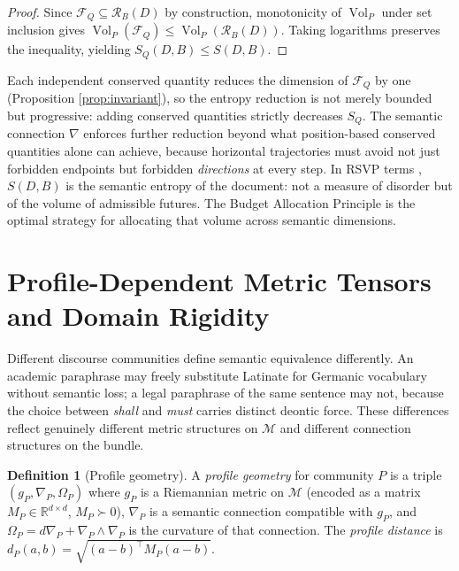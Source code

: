 \documentclass[12pt, a4paper]{article}
\theoremstyle{plain}
\theoremstyle{definition}
\newtheorem{definition}[theorem]{Definition}
\theoremstyle{remark}
\newcommand{\calM}{\mathcal{M}}
\newcommand{\calF}{\mathcal{F}}
\newcommand{\calR}{\mathcal{R}}
\newcommand{\bR}{\mathbb{R}}
\newcommand{\connD}{\nabla}
\newcommand{\curv}{\Omega}
\begin{document}
\begin{proof}
Since $\calF_Q \subseteq \calR_B(D)$ by construction, monotonicity of
$\operatorname{Vol}_P$ under set inclusion gives
$\operatorname{Vol}_P(\calF_Q) \le \operatorname{Vol}_P(\calR_B(D))$.
Taking logarithms preserves the inequality, yielding $S_Q(D,B) \le S(D,B)$.
\end{proof}

Each independent conserved quantity reduces the dimension of $\calF_Q$ by one
(Proposition \ref{prop:invariant}), so the entropy reduction is not merely
bounded but progressive: adding conserved quantities strictly decreases $S_Q$.
The semantic connection $\connD$ enforces further reduction beyond what
position-based conserved quantities alone can achieve, because horizontal
trajectories must avoid not just forbidden endpoints but forbidden
\emph{directions} at every step.  In RSVP terms \cite{flyxion2025rsvp},
$S(D, B)$ is the semantic entropy of the document: not a measure of disorder
but of the volume of admissible futures.  The Budget Allocation Principle is
the optimal strategy for allocating that volume across semantic dimensions.


\section{Profile-Dependent Metric Tensors and Domain Rigidity}
\label{sec:profiles}

Different discourse communities define semantic equivalence differently.  An
academic paraphrase may freely substitute Latinate for Germanic vocabulary
without semantic loss; a legal paraphrase of the same sentence may not, because
the choice between \emph{shall} and \emph{must} carries distinct deontic force.
These differences reflect genuinely different metric structures on $\calM$ and
different connection structures on the bundle.

\begin{definition}[Profile geometry]
\label{def:profile_geometry}
A \emph{profile geometry} for community $P$ is a triple $(g_P, \connD_P, \curv_P)$
where $g_P$ is a Riemannian metric on $\calM$ (encoded as a matrix
$M_P \in \bR^{d\times d}$, $M_P \succ 0$), $\connD_P$ is a semantic connection
compatible with $g_P$, and $\curv_P = d\connD_P + \connD_P \wedge \connD_P$
is the curvature of that connection.  The \emph{profile distance} is
$d_P(a,b) = \sqrt{(a-b)^\top M_P (a-b)}$.
\end{definition}
\end{document}
